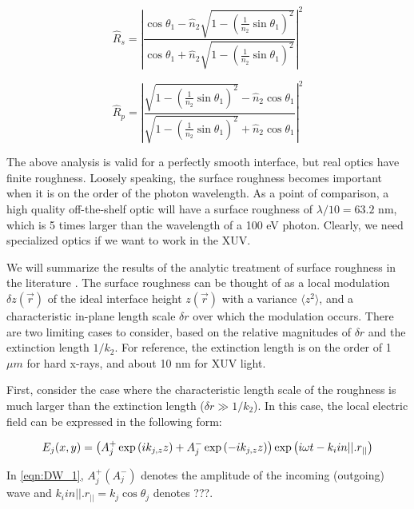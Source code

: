 \begin{equation}
\hat{R}_s = \left| \frac{\cos \theta_1 - \hat{n}_2 \sqrt{1-\left(\frac{1}{n_2}\sin \theta_1\right)^2}}{\cos \theta_1 + \hat{n}_2 \sqrt{1-\left(\frac{1}{n_2}\sin \theta_1\right)^2}} \right|^2
\label{eqn:Fresnel_Rs_2}
\end{equation}

\begin{equation}
\hat{R}_p = \left| \frac{\sqrt{1-\left(\frac{1}{n_2}\sin \theta_1\right)^2} - \hat{n}_2 \cos \theta_1}{\sqrt{1-\left(\frac{1}{n_2}\sin \theta_1\right)^2} + \hat{n}_2 \cos \theta_1} \right|^2
\label{eqn:Fresnel_Rp_2}
\end{equation}

The above analysis is valid for a perfectly smooth interface, but real optics have finite roughness. Loosely speaking, the surface roughness becomes important when it is on the order of the photon wavelength. As a point of comparison, a high quality off-the-shelf optic will have a surface roughness of $\lambda/10 = 63.2 \text{ nm}$, which is 5 times larger than the wavelength of a 100 eV photon. Clearly, we need specialized optics if we want to work in the XUV.

We will summarize the results of the analytic treatment of surface roughness in the literature \cite{sentenacStatisticalAspectsWave2009, gibaudSpecularReflectivitySmooth2009}. The surface roughness can be thought of as a local modulation $\delta z(\vec{r})$ of the ideal interface height $z(\vec{r})$ with a variance $\langle z^2 \rangle$, and a characteristic in-plane length scale $\delta r$ over which the modulation occurs. There are two limiting cases to consider, based on the relative magnitudes of $\delta r$ and the extinction length $1/k_2$. For reference, the extinction length is on the order of 1 $\mu m$ for hard x-rays, and about 10 nm for XUV light.

First, consider the case where the characteristic length scale of the roughness is much larger than the extinction length ($\delta r \gg 1/k_2$). In this case, the local electric field can be expressed in the following form:

\begin{equation}
E_j (x,y) = \left( A_j^+ \exp \left(i k_{j,z} z \right) +  A_j^- \exp \left( - i k_{j,z} z \right)  \right) \exp \left( i \omega t - \boldmath{k}_i in||.\boldmath{r_{||}} \right)
\label{eqn:DW_1}
\end{equation}

In \cref{eqn:DW_1}, $A_j^+ (A_j^-)$ denotes the amplitude of the incoming (outgoing) wave and $k_i in ||.r_{||} = k_j \cos \theta_j$ denotes ???.

